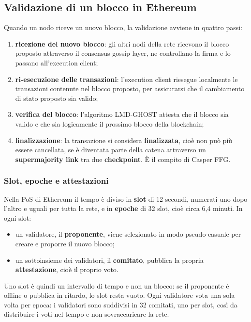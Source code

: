 \documentclass[a4paper, 11pt, oneside]{book}
\begin{document}
	\subsection{Validazione di un blocco in Ethereum}
	Quando un nodo riceve un nuovo blocco, la validazione avviene in quattro passi:
	\begin{enumerate}
		\item \textbf{ricezione del nuovo blocco}: gli altri nodi della rete ricevono il
			blocco proposto attraverso il consensus gossip layer, ne controllano la firma
			e lo passano all'execution client;
		\item \textbf{ri-esecuzione delle transazioni}: l'execution client riesegue
			localmente le transazioni contenute nel blocco proposto, per assicurarsi che il
			cambiamento di stato proposto sia valido;
		\item \textbf{verifica del blocco}: l'algoritmo LMD-GHOST attesta che il blocco sia
			valido e che sia logicamente il prossimo blocco della blockchain;
		\item \textbf{finalizzazione}: la transazione si considera \textbf{finalizzata},
			cioè non può più essere cancellata, se è diventata parte della catena
			attraverso un \textbf{supermajority link} tra due \textbf{checkpoint}. È il
			compito di Casper FFG.
	\end{enumerate}

	\subsubsection{Slot, epoche e attestazioni}
	Nella PoS di Ethereum il tempo è diviso in \textbf{slot} di 12 secondi, numerati uno
	dopo l'altro e uguali per tutta la rete, e in \textbf{epoche} di 32 slot, cioè circa
	6,4 minuti. In ogni slot:
	\begin{itemize}
		\item un validatore, il \textbf{proponente}, viene selezionato in modo
			pseudo-casuale per creare e proporre il nuovo blocco;
		\item un sottoinsieme dei validatori, il \textbf{comitato}, pubblica la propria
			\textbf{attestazione}, cioè il proprio voto.
	\end{itemize}
	Uno slot è quindi un intervallo di tempo e non un blocco: se il proponente è offline
	o pubblica in ritardo, lo slot resta vuoto. Ogni validatore vota una sola volta per
	epoca: i validatori sono suddivisi in 32 comitati, uno per slot, così da distribuire
	i voti nel tempo e non sovraccaricare la rete.
\end{document}
